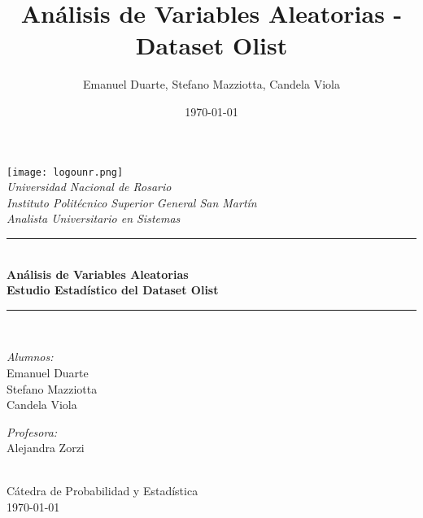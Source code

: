 \documentclass[12pt,a4paper,twoside]{article}
\title{Análisis de Variables Aleatorias - Dataset Olist}
\author{Emanuel Duarte, Stefano Mazziotta, Candela Viola}
\date{\today}
\begin{document}
\begin{titlepage}
    \center
    
    \texttt{[image: logounr.png]}\\[0.5cm]
    
    \textsl{\Large Universidad Nacional de Rosario}\\[0.3cm]
    \textsl{\large Instituto Politécnico Superior General San Martín}\\[0.2cm]
    \textsl{\large Analista Universitario en Sistemas}\\[1.0cm]
    
    \rule{\linewidth}{0.5mm} \\[0.3cm]
    {\huge \bfseries Análisis de Variables Aleatorias}\\[0.2cm]
    {\Large \bfseries Estudio Estadístico del Dataset Olist}\\[0.3cm]
    \rule{\linewidth}{0.5mm} \\[1.0cm]
    
    \begin{minipage}{0.45\textwidth}
        \begin{flushleft} \large
            \emph{Alumnos:}\\
            Emanuel Duarte\\
            Stefano Mazziotta\\
            Candela Viola
        \end{flushleft}
    \end{minipage}
    \begin{minipage}{0.45\textwidth}
        \begin{flushright} \large
            \emph{Profesora:}\\
            Alejandra Zorzi
        \end{flushright}
    \end{minipage}\\[1.5cm]
    
    {\large Cátedra de Probabilidad y Estadística}\\[0.5cm]
    {\large \today}
    
    \vfill
\end{titlepage}

\newpage
\tableofcontents
\newpage
\end{document}
